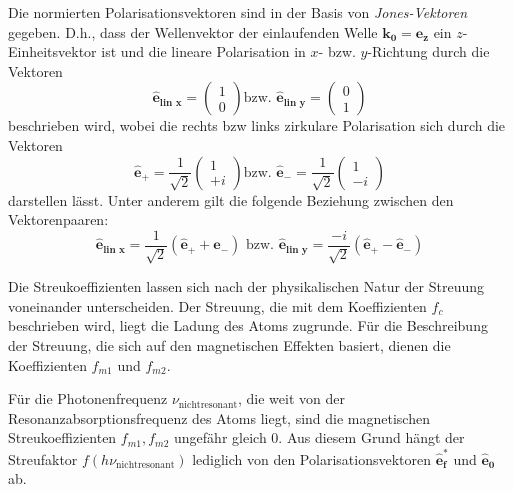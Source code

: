 \noindent
Die normierten Polarisationsvektoren sind in der Basis von \emph{Jones-Vektoren} gegeben. D.h., dass der Wellenvektor der einlaufenden Welle $\mathbf{k_0} = \mathbf{e_{z}}$ ein $z$-Einheitsvektor ist und die lineare Polarisation in $x$- bzw. $y$-Richtung durch die Vektoren
\begin{equation}
    \mathbf{\hat{e}_{\text{lin $x$}}} = \begin{pmatrix}
    1\\
    0
    \end{pmatrix}
    \text{bzw. }
    \mathbf{\hat{e}_{\text{lin $y$}}} = \begin{pmatrix}
    0\\
    1
    \end{pmatrix}
    \label{eq:lin_jones}
\end{equation}
beschrieben wird, wobei die rechts bzw links zirkulare Polarisation sich durch die Vektoren 
\begin{equation}
    \mathbf{\hat{e}_+} = \frac{1}{\sqrt{2}}\begin{pmatrix}
    1\\
    +i
    \end{pmatrix}
    \text{bzw. }
    \mathbf{\hat{e}_-} = \frac{1}{\sqrt{2}}\begin{pmatrix}
    1\\
    -i
    \end{pmatrix}
    \label{eq:circ_jones}
\end{equation}
darstellen lässt. Unter anderem gilt die folgende Beziehung zwischen den Vektorenpaaren:
\begin{equation}
    \mathbf{\hat{e}_{\text{lin $x$}}} = \frac{1}{\sqrt{2}}(\mathbf{\hat{e}_+} + \mathbf{\hat{e}_-}) \text{ bzw. } \mathbf{\hat{e}_{\text{lin $y$}}} = \frac{-i}{\sqrt{2}}(\mathbf{\hat{e}_+} - \mathbf{\hat{e}_-})
    \label{eq:lin_circ_jones}
\end{equation}

\noindent
Die Streukoeffizienten lassen sich nach der physikalischen Natur der Streuung voneinander unterscheiden. Der Streuung, die mit dem Koeffizienten $f_c$ beschrieben wird, liegt die Ladung des Atoms zugrunde. Für die Beschreibung der Streuung, die sich auf den magnetischen Effekten basiert, dienen die Koeffizienten $f_{m1}$ und $f_{m2}$.


\noindent
Für die Photonenfrequenz $\nu_{\text{nichtresonant}}$, die weit von der Resonanzabsorptionsfrequenz des Atoms liegt, sind die magnetischen Streukoeffizienten  $f_{m1}, f_{m2}$ ungefähr gleich 0. Aus diesem Grund hängt der Streufaktor $f(h\nu_{\text{nichtresonant}})$ lediglich von den Polarisationsvektoren $\mathbf{\hat{e}_f^*}$ und $\mathbf{\hat{e}_0}$ ab.
%     

